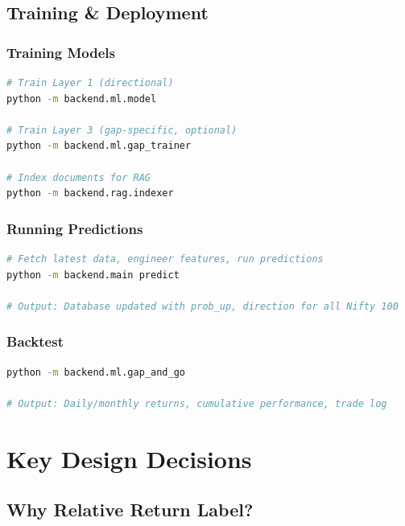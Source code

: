\documentclass[11pt,a4paper]{article}
\begin{document}
\subsection{Training & Deployment}

\subsubsection{Training Models}

\begin{lstlisting}[language=bash, caption=Train Models]
# Train Layer 1 (directional)
python -m backend.ml.model

# Train Layer 3 (gap-specific, optional)
python -m backend.ml.gap_trainer

# Index documents for RAG
python -m backend.rag.indexer
\end{lstlisting}

\subsubsection{Running Predictions}

\begin{lstlisting}[language=bash, caption=Daily Prediction Run]
# Fetch latest data, engineer features, run predictions
python -m backend.main predict

# Output: Database updated with prob_up, direction for all Nifty 100
\end{lstlisting}

\subsubsection{Backtest}

\begin{lstlisting}[language=bash, caption=Backtest Execution]
python -m backend.ml.gap_and_go

# Output: Daily/monthly returns, cumulative performance, trade log
\end{lstlisting}

\section{Key Design Decisions}

\subsection{Why Relative Return Label?}
\end{document}
